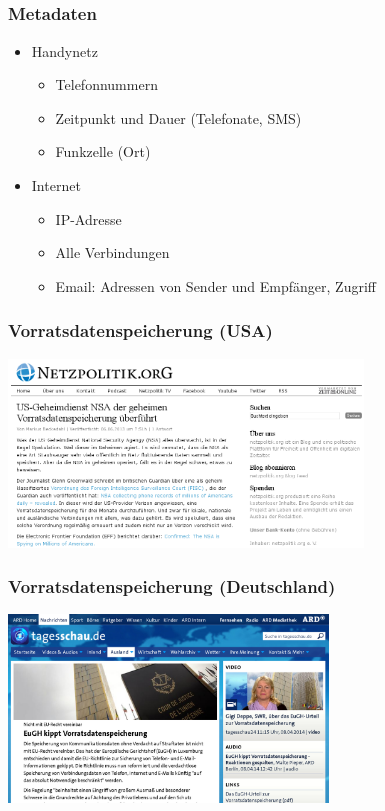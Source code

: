 \documentclass[12pt]{beamer}
\begin{document}
\subsection{}

\begin{frame}
  \frametitle{Metadaten}
  \begin{itemize}
    \item Handynetz
      \begin{itemize}
        \item Telefonnummern
        \item Zeitpunkt und Dauer (Telefonate, SMS)
        \item Funkzelle (Ort)
      \end{itemize}
    \item Internet
      \begin{itemize}
        \item IP-Adresse
        \item Alle Verbindungen
        \item Email: Adressen von Sender und Empfänger, Zugriff
      \end{itemize}
  \end{itemize}
\end{frame}

\begin{frame}
  \frametitle{Vorratsdatenspeicherung (USA)}
    \begin{center}
      \includegraphics[height=5cm]{img/netzpolitik-verizon.png}
    \end{center}
\end{frame}

\begin{frame}
  \frametitle{Vorratsdatenspeicherung (Deutschland)}
    \begin{center}
      \includegraphics[height=5cm]{img/tagesschau-vds.png}
    \end{center}
\end{frame}
\end{document}
